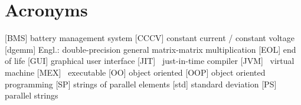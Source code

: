 \section*{Acronyms}
\thispagestyle{plain}
\begin{acronym}
	[BMS] battery management system
	[CCCV] constant current / constant voltage
	[dgemm] Engl.: double-precision general matrix-matrix multiplication
	[EOL] end of life
	[GUI] graphical user interface
	[JIT] \matlab\ just-in-time compiler
	[JVM] \java\ virtual machine
	[MEX] \matlab\ executable
	[OO] object oriented
	[OOP] object oriented programming
	[SP] strings of parallel elements
	[std] standard deviation
	[PS] parallel strings
\end{acronym}